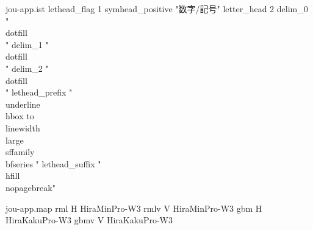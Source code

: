 \begin{filecontents}{jou-app.ist}
lethead_flag            1
symhead_positive	"数字/記号"
letter_head		2
delim_0			" \\dotfill\\ "
delim_1			" \\dotfill\\ "
delim_2			" \\dotfill\\ "
lethead_prefix "\n\\underline{\\hbox to \\linewidth{\\large{\\sffamily\\bfseries "
lethead_suffix "\\hfill}}}\\nopagebreak\n"
\end{filecontents}

\begin{filecontents}{jou-app.map}
rml	H	HiraMinPro-W3
rmlv	V	HiraMinPro-W3
gbm	H	HiraKakuPro-W3
gbmv	V	HiraKakuPro-W3
\end{filecontents}

\documentclass[dvipdfmx,papersize]{jsarticle}
\usepackage{makeidx,type1cm,okumacro,url,graphicx,color,multicol,example}
\makeindex
[ksec]
\renewcommand\thekaito{\theksec.\arabic{kaito}}
\newcommand*\appkaito{\setcounter{ksec}{1}\def\theksec{\Alph{ksec}}}
\newcommand*\kaitomidasi[1]{%
  \refstepcounter{ksec}\subsection{#1}}
\newcommand\kaito[1]{%
\setcounter{kaito}{#1}\item[解答~\thekaito]}
\newcommand*\G[1]{\index{#1}#1}
\newcommand*\yougo[3]{\index{#2}\index{#1@#1 (#2)}%
  \item[{\gtfamily #1}]#2\space(#3)\quad}
\newcommand*\yougohead[1]{\par
  \centerline{\gtfamily\large #1}\par\vskip\fboxsep
  \hrule\par\vskip.1\cvs}
\newcommand*\fl[1]{\index{ファイル!#1@\texttt{#1}}\texttt{#1}}
\newcommand*\cmd[1]{\index{#1@\texttt{\protect\BS#1}}\texttt{\BS#1}}
\newcommand*\env[1]{\index{#1@\texttt{#1 環境}}\texttt{#1} 環境}
\addtolength{\fullwidth}{1sp}
\addtolength{\textheight}{3\cvs}
\addtolength{\topmargin}{-3\cvs}
\addtolength{\footskip}{\cvs}


